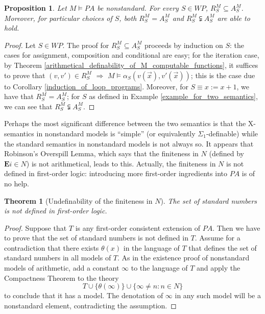\documentclass[a4paper,11pt]{article}
\begin{document}
\newtheorem{comparison_of_two_semantics_over_M}[example_for_two_semantics]{Proposition}
\begin{comparison_of_two_semantics_over_M}\label{comparison_of_two_semantics_over_M}
  Let $M\models PA$ be nonstandard. For every $S\in WP$, $R_S^M \subseteq A_S^M$. Moreover, for particular choices of $S$, both $R_S^M = A_S^M$ and $R_S^M \subsetneqq A_S^M$ are able to hold.
\end{comparison_of_two_semantics_over_M}
\begin{proof}
  Let $S\in WP$. The proof for $R_S^M \subseteq A_S^M$ proceeds by induction on $S$: the cases for assignment, composition and conditional are easy; for the iteration case, by Theorem \ref{arithmetical_definability_of_M_computable_functions}, it suffices to prove that $(v,v')\in R_S^M$ $\Rightarrow$ $M \models \alpha_S(v(\vec{x}), v'(\vec{x}))$; this is the case due to Corollary \ref{induction_of_loop_programs}. Moreover, for $S \equiv x := x + 1$, we have that $R_S^M = A_S^M$; for $S$ as defined in Example \ref{example_for_two_semantics}, we can see that $R_S^M \subsetneqq A_S^M$.
\end{proof}

Perhaps the most significant difference between the two semantics is that the X-semantics in nonstandard models is ``simple'' (or equivalently $\Sigma_1$-definable) while the standard semantics in nonstandard models is not always so. It appears that Robinson's Overspill Lemma, which says that the finiteness in $N$ (defined by $\textbf{E} i \in N$) is not arithmetical, leads to this. Actually, the finiteness in $N$ is not defined in first-order logic: introducing more first-order ingredients into $PA$ is of no help.

\newtheorem{standard_numbers_is_not_definable_in_first_order_logic}[example_for_two_semantics]{Theorem}
\begin{standard_numbers_is_not_definable_in_first_order_logic}[Undefinability of the finiteness in $N$]\label{standard_numbers_is_not_definable_in_first_order_logic}
  The set of standard numbers is not defined in first-order logic.
\end{standard_numbers_is_not_definable_in_first_order_logic}
\begin{proof}
Suppose that $T$ is any first-order consistent extension of $PA$. Then we have to prove that the set of standard numbers is not defined in $T$. Assume for a contradiction that there exists $\theta(x)$ in the language of $T$ that defines the set of standard numbers in all models of $T$. As in the existence proof of nonstandard models of arithmetic, add a constant $\infty$ to the language of $T$ and apply the Compactness Theorem \cite[Theorem 12.15]{c. and l.} to the theory
  \begin{equation*}
    T\cup \{ \theta(\infty) \} \cup \{ \infty \neq n : n\in N \}
  \end{equation*}
  to conclude that it has a model. The denotation of $\infty$ in any such model will be a nonstandard element, contradicting the assumption.
\end{proof}
\end{document}
